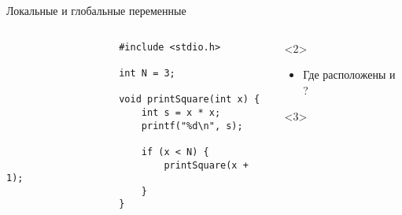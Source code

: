 \documentclass[aspectratio=169,14pt]{beamer}
\begin{document}
    \begin{frame}[fragile]{Локальные и глобальные переменные}
        \begin{columns}
            \begin{column}{0.5\textwidth}
                \begin{verbatim}
                    #include <stdio.h>

                    int N = 3;

                    void printSquare(int x) {
                        int s = x * x;
                        printf("%d\n", s);

                        if (x < N) {
                            printSquare(x + 1);
                        }
                    }
                \end{verbatim}
            \end{column}
            \begin{column}{0.5\textwidth}
                \begin{onlyenv}<2>
                    \begin{itemize}
                        \item Где расположены  и ?
                    \end{itemize}
                \end{onlyenv}
                \begin{onlyenv}<3>
                    \begin{tikzpicture}[ scale=1 ]
                    \end{tikzpicture}
                \end{onlyenv}
            \end{column}
        \end{columns}
    \end{frame}

    \qnaframe
\end{document}
